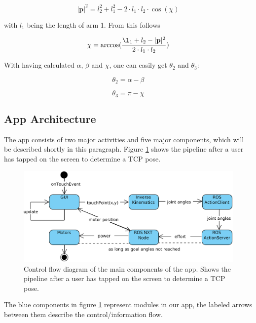 \documentclass[conference]{IEEEtran}
\begin{document}
\begin{equation}
|\textbf{p}|^2 = l_2^2 + l_1^2 - 2 \cdot l_1 \cdot l_2 \cdot \cos(\chi)
\end{equation}

with $l_1$ being the length of arm 1. From this follows

\begin{equation}
\chi = \arccos(\frac{\l_1 + l_2 - |\textbf{p}|^2}{2 \cdot l_1 \cdot l_2})
\end{equation}

With having calculated $\alpha$, $\beta$ and $\chi$, one can easily get $\theta_2$ and $\theta_3$:

\begin{equation}
\theta_2 = \alpha - \beta
\end{equation}

\begin{equation}
\theta_3 = \pi - \chi
\end{equation}

\subsection{App Architecture}\label{sec:architecture}
The app consists of two major activities and five major components, which will be described shortly in this paragraph. Figure \ref{fig:app_pipeline} shows the pipeline after a user has tapped on the screen to determine a TCP pose.

\begin{figure}[htbp]
	\centerline{\includegraphics[scale=0.15]{img/app_pipeline.png}}
	\caption{Control flow diagram of the main components of the app. Shows the pipeline after a user has tapped on the screen to determine a TCP pose.}
	\label{fig:app_pipeline}
\end{figure}

The blue components in figure \ref{fig:app_pipeline} represent modules in our app, the labeled arrows between them describe the control/information flow.
\end{document}
